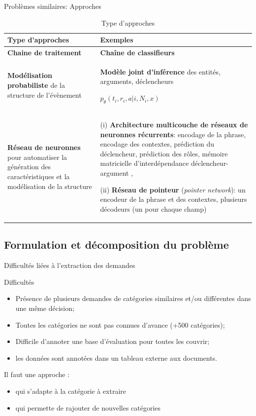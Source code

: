 \documentclass[newPxFont,pagenumber]{beamer}
\begin{document}
\begin{frame}{Problèmes similaires: Approches}
\scriptsize
\begin{table}
\scriptsize
\begin{tabular}{|p{}|p{}|}
\hline
\textbf{Type d'approches} & \textbf{Exemples} \\ \hline
\textbf{Chaine de traitement} & \textbf{Chaîne de classifieurs  }\cite{ahn2006stages} \\ \hline
\textbf{Modélisation probabiliste} de la structure de l'évènement & \textbf{Modèle joint d'inférence} des entités, arguments, déclencheurs

$p_\theta(t_i, r_i, a \vert i, N_i, x)$ \cite{yang2016jointEntityEvt} %
\\ \hline
\textbf{Réseau de neuronnes} pour automatiser la génération des caractéristiques et la modélisation de la structure & (i) \textbf{Architecture multicouche de réseaux de neuronnes récurrents}: encodage de la phrase, encodage des contextes, prédiction du déclencheur, prédiction des rôles, mémoire matricielle d'interdépendance déclencheur-argument \cite{nguyen2016jointtrgarg},  

(ii) \textbf{Réseau de pointeur} (\textit{pointer network}): un encodeur de la phrase et des contextes, plusieurs décodeurs (un pour chaque champ) \cite{palm2017e2e-dnn} \\ \hline
\end{tabular}
\caption{\scriptsize Type d'approches}
\end{table}
\end{frame}

\subsection{Formulation et décomposition du problème}

\begin{frame}{Difficultés liées à l'extraction des demandes}
\begin{alertblock}{Difficultés}
\begin{itemize}
\item Présence de plusieurs demandes de catégories similaires et/ou différentes dans une m\^eme décision;
\item Toutes les catégories ne sont pas connues d'avance (+500 catégories);
\item Difficile d'annoter une base d'évaluation pour toutes les couvrir;
\item les données sont annotées dans un tableau externe aux documents.
\end{itemize}
\end{alertblock}

\begin{block}{Il faut une approche :}
\begin{itemize}
\item qui s'adapte à la catégorie à extraire 
\item qui permette de rajouter de nouvelles catégories 
\end{itemize}
\end{block}
\end{frame}
\end{document}

